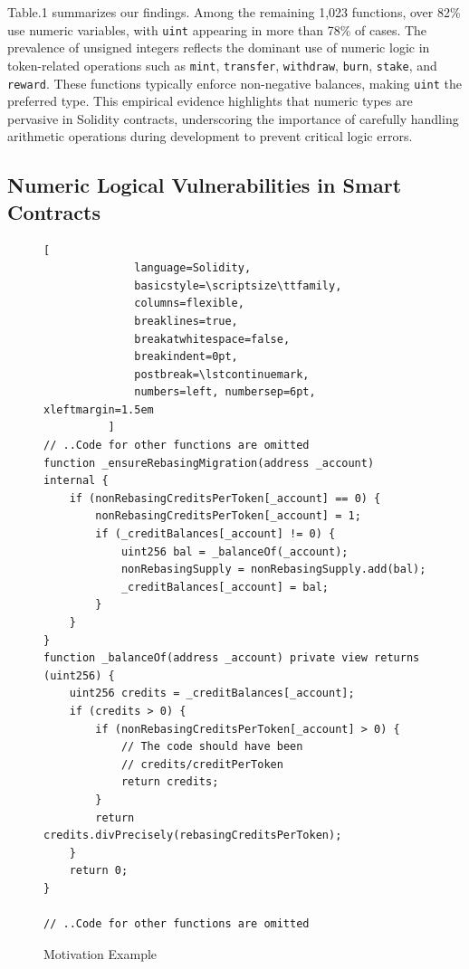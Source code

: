 \documentclass[pdflatex,sn-basic]{sn-jnl}%
\newcommand{\lstcontinuemark}{\mbox{\textcolor{gray}{\(\hookrightarrow\)}}\space}
\theoremstyle{thmstyleone}%
\theoremstyle{thmstyletwo}%
\theoremstyle{thmstylethree}%
\begin{document}
Table.1 summarizes our findings. Among the remaining 1,023 functions, over 82\% use numeric variables, with \texttt{uint} appearing in more than 78\% of cases. The prevalence of unsigned integers reflects the dominant use of numeric logic in token-related operations such as \texttt{mint}, \texttt{transfer}, \texttt{withdraw}, \texttt{burn}, \texttt{stake}, and \texttt{reward}. These functions typically enforce non-negative balances, making \texttt{uint} the preferred type. This empirical evidence highlights that numeric types are pervasive in Solidity contracts, underscoring the importance of carefully handling arithmetic operations during development to prevent critical logic errors.


\subsection{Numeric Logical Vulnerabilities in Smart Contracts}

    \begin{figure}
                \centering
          \begin{lstlisting}[
              language=Solidity,
              basicstyle=\scriptsize\ttfamily,
              columns=flexible,
              breaklines=true,
              breakatwhitespace=false,
              breakindent=0pt,
              postbreak=\lstcontinuemark,
              numbers=left, numbersep=6pt, xleftmargin=1.5em
          ]
// ..Code for other functions are omitted
function _ensureRebasingMigration(address _account) internal {
    if (nonRebasingCreditsPerToken[_account] == 0) {
        nonRebasingCreditsPerToken[_account] = 1;
        if (_creditBalances[_account] != 0) {            
            uint256 bal = _balanceOf(_account);
            nonRebasingSupply = nonRebasingSupply.add(bal);
            _creditBalances[_account] = bal;
        }            
    }
}
function _balanceOf(address _account) private view returns (uint256) {
    uint256 credits = _creditBalances[_account];
    if (credits > 0) {
        if (nonRebasingCreditsPerToken[_account] > 0) {
            // The code should have been 
            // credits/creditPerToken
            return credits;
        }
        return credits.divPrecisely(rebasingCreditsPerToken);
    }
    return 0;
}

// ..Code for other functions are omitted
        \end{lstlisting}
        \caption{Motivation Example~\citep{fig1}}
    \end{figure}
    
\end{document}
